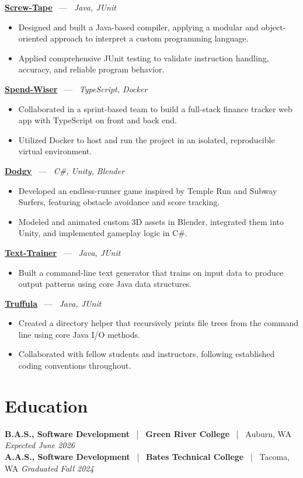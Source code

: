 \documentclass[10pt, letterpaper]{article}
\newcommand{\jobhead}[4]{%
  \vspace{5pt}%
  {\bfseries\color{dark}#1}%
  ~{\color{light}|}~%
  {\bfseries\color{navy}#2}%
  ~{\color{light}|}~%
  {\color{light}#3}%
  \hfill{\color{light}\small\textit{#4}}\\[-2pt]%
}
\newcommand{\projhead}[3]{%
  \vspace{5pt}%
  {\bfseries\color{dark}\href{#2}{#1}}%
  ~{\color{light}---}~%
  {\color{light}\small\textit{#3}}\\[-2pt]%
}
\begin{document}
\projhead{Screw-Tape}{https://github.com/timmyd4/screwtape}{Java, JUnit}
\begin{itemize}
  \item Designed and built a Java-based compiler, applying a modular and object-oriented approach to interpret a custom programming language.
  \item Applied comprehensive JUnit testing to validate instruction handling, accuracy, and reliable program behavior.
\end{itemize}

\projhead{Spend-Wiser}{https://github.com/JesseChum/w26-sdev372-spendwiser-finance-tracker}{TypeScript, Docker}
\begin{itemize}
  \item Collaborated in a sprint-based team to build a full-stack finance tracker web app with TypeScript on front and back end.
  \item Utilized Docker to host and run the project in an isolated, reproducible virtual environment.
\end{itemize}

\projhead{Dodgy}{https://timyd.itch.io/dodgy}{C\#, Unity, Blender}
\begin{itemize}
  \item Developed an endless-runner game inspired by Temple Run and Subway Surfers, featuring obstacle avoidance and score tracking.
  \item Modeled and animated custom 3D assets in Blender, integrated them into Unity, and implemented gameplay logic in C\#.
\end{itemize}

\projhead{Text-Trainer}{https://github.com/timmyd4/ramblebot}{Java, JUnit}
\begin{itemize}
  \item Built a command-line text generator that trains on input data to produce output patterns using core Java data structures.
\end{itemize}

\projhead{Truffula}{https://github.com/timmyd4/truffula}{Java, JUnit}
\begin{itemize}
  \item Created a directory helper that recursively prints file trees from the command line using core Java I/O methods.
  \item Collaborated with fellow students and instructors, following established coding conventions throughout.
\end{itemize}

\section{Education}

\jobhead{B.A.S., Software Development}{Green River College}{Auburn, WA}{Expected June 2026}
\jobhead{A.A.S., Software Development}{Bates Technical College}{Tacoma, WA}{Graduated Fall 2024}
\end{document}
